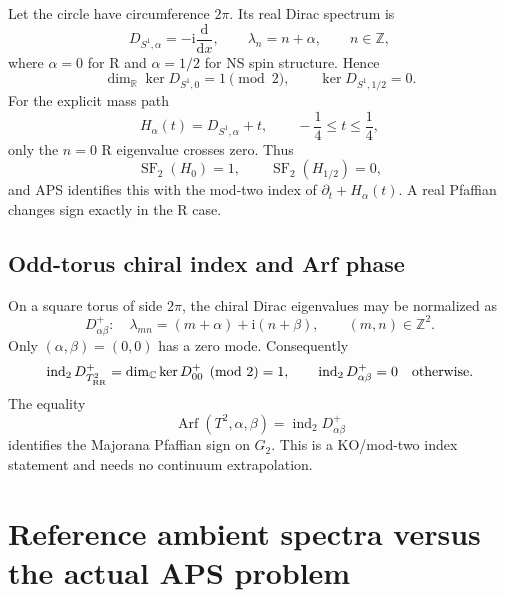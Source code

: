\documentclass[11pt]{article}
\theoremstyle{definition}
\theoremstyle{remark}
\newcommand{\dd}{\mathrm d}
\newcommand{\ii}{\mathrm i}
\newcommand{\ZZ}{\mathbb Z}
\newcommand{\RR}{\mathbb R}
\newcommand{\CC}{\mathbb C}
\newcommand{\Arf}{\operatorname{Arf}}
\newcommand{\ind}{\operatorname{ind}}
\newcommand{\SF}{\operatorname{SF}}
\begin{document}
Let the circle have circumference \(2\pi\).  Its real Dirac spectrum is
\begin{equation}
 D_{S^1,\alpha}=-\ii\frac{\dd}{\dd x},
 \qquad
 \lambda_n=n+\alpha,
 \qquad n\in\ZZ,
 \label{eq:circle-spectrum}
\end{equation}
where \(\alpha=0\) for R and \(\alpha=1/2\) for NS spin structure.  Hence
\begin{equation}
 \dim_{\RR}\ker D_{S^1,0}=1\pmod2,
 \qquad
 \ker D_{S^1,1/2}=0.
 \label{eq:circle-ko-index}
\end{equation}
For the explicit mass path
\begin{equation}
 H_\alpha(t)=D_{S^1,\alpha}+t,
 \qquad -\frac14\le t\le\frac14,
 \label{eq:circle-mass-path}
\end{equation}
only the \(n=0\) R eigenvalue crosses zero.  Thus
\begin{equation}
 \SF_2(H_0)=1,
 \qquad
 \SF_2(H_{1/2})=0,
 \label{eq:circle-sf}
\end{equation}
and APS identifies this with the mod-two index of
\(\partial_t+H_\alpha(t)\).  A real Pfaffian changes sign exactly in the R
case.

\subsection{Odd-torus chiral index and Arf phase}

On a square torus of side \(2\pi\), the chiral Dirac eigenvalues may be
normalized as
\begin{equation}
 D^+_{\alpha\beta}:\quad
 \lambda_{mn}=(m+\alpha)+\ii(n+\beta),
 \qquad (m,n)\in\ZZ^2.
 \label{eq:torus-spectrum}
\end{equation}
Only \((\alpha,\beta)=(0,0)\) has a zero mode.  Consequently
\begin{equation}
 \ind_2 D^+_{T^2_{\rm RR}}
 =\dim_{\CC}\ker D^+_{00}\pmod2=1,
 \qquad
 \ind_2D^+_{\alpha\beta}=0
 \quad\text{otherwise}.
 \label{eq:torus-index}
\end{equation}
The equality
\begin{equation}
 \Arf(T^2,\alpha,\beta)=\ind_2D^+_{\alpha\beta}
 \label{eq:arf-index}
\end{equation}
identifies the Majorana Pfaffian sign on \(G_2\).  This is a KO/mod-two
index statement and needs no continuum extrapolation.

\section{Reference ambient spectra versus the actual APS problem}
\end{document}
